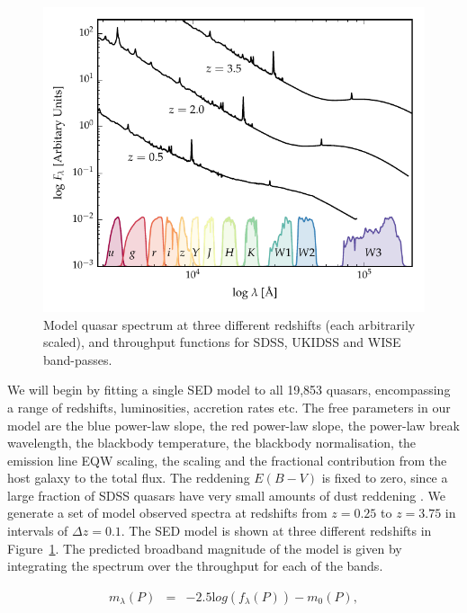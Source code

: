 \begin{figure}
  \centering
  \includegraphics[width=\textwidth]{figures/chapter05/throughput.pdf}
  \caption[{Model quasar spectrum at three different redshifts, and throughput functions for SDSS, UKIDSS and WISE band-passes.}]{Model quasar spectrum at three different redshifts (each arbitrarily scaled), and throughput functions for SDSS, UKIDSS and WISE band-passes.}
  \label{fig:filters}
\end{figure}

We will begin by fitting a single SED model to all 19,853 quasars, encompassing a range of redshifts, luminosities, accretion rates etc. 
The free parameters in our model are the blue power-law slope, the red power-law slope, the power-law break wavelength, the blackbody temperature, the blackbody normalisation, the emission line EQW scaling, the \ha scaling and the fractional contribution from the host galaxy to the total flux. 
The reddening $E(B-V)$ is fixed to zero, since a large fraction of SDSS quasars have very small amounts of dust reddening \citep{richards03}. 
We generate a set of model observed spectra at redshifts from $z=0.25$ to $z=3.75$ in intervals of $\Delta z = 0.1$. 
The SED model is shown at three different redshifts in Figure~\ref{fig:filters}. 
The predicted broadband magnitude of the model is given by integrating the spectrum over the throughput for each of the bands.  

\begin{eqnarray}
  m_\lambda(P) & = & -2.5{\mathrm log}(f_\lambda(P)) - m_0(P), 
\end{eqnarray}

